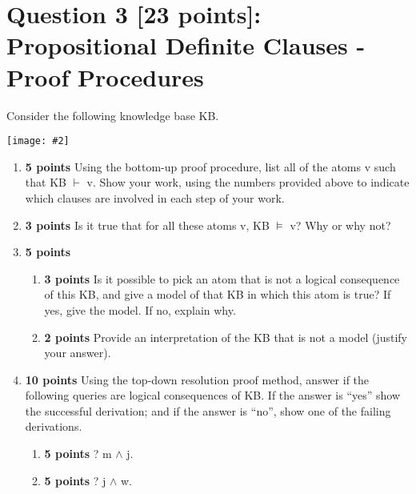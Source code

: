 \documentclass{article}
\newcommand{\centerfig}[2]{\begin{center}\texttt{[image: \#2]}\end{center}}
\begin{document}
\clearpage
\section{Question 3 [23 points]: Propositional Definite Clauses - Proof Procedures}
Consider the following knowledge base KB.
\centerfig{0.2}{../figs/fig2}
\begin{enumerate}[label=(\alph*)]
    \item \textbf{5 points} Using the bottom-up proof procedure, list all of the atoms v such that KB $\vdash$ v. Show your work, using the numbers provided above to indicate which clauses are involved in each step of your work.
    \item \textbf{3 points} Is it true that for all these atoms v, KB $\vDash$ v? Why or why not?
    \item \textbf{5 points}
    \begin{enumerate}[label=\roman*.]
        \item \textbf{3 points} Is it possible to pick an atom that is not a logical consequence of this KB, and give a model of that KB in which this atom is true? If yes, give the model. If no, explain why.
        \item \textbf{2 points} Provide an interpretation of the KB that is not a model (justify your answer).
    \end{enumerate}
    \item \textbf{10 points} Using the top-down resolution proof method, answer if the following queries are logical consequences of KB. If the answer is “yes” show the successful derivation; and if the answer is “no”, show one of the failing derivations.
    \begin{enumerate}[label=\roman*.]
        \item \textbf{5 points} ? m $\wedge$ j.
        \item \textbf{5 points} ? j $\wedge$ w.
    \end{enumerate}
\end{enumerate}

\clearpage
\end{document}
